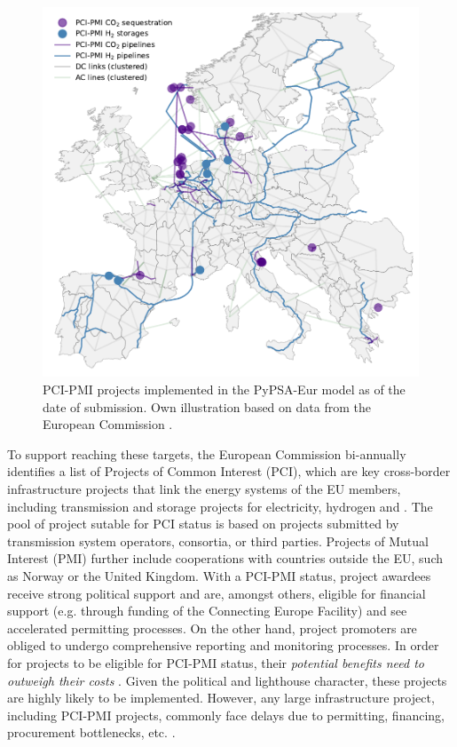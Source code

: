 \documentclass[final,5p,times,twocolumn]{elsarticle}
\let\autocite\cite
\begin{document}
\begin{figure}[t]
  \centering
  \includegraphics[width=1\linewidth]{pci_pmi_projects_map}
  \caption{PCI-PMI projects implemented in the PyPSA-Eur model as of the date of submission. Own illustration based on data from the European Commission \autocite{europeancommissionPCIPMITransparencyPlatform2024}.}
  \label{fig:pci_pmi_projects_map}
\end{figure}


To support reaching these targets, the European Commission bi-annually identifies a list of Projects of Common Interest (PCI), which are key cross-border infrastructure projects that link the energy systems of the EU members, including transmission and storage projects for electricity, hydrogen and  \autocite{europeancommissionCommissionDelegatedRegulation2023}. 
The pool of project sutable for PCI status is based on projects submitted by transmission system operators, consortia, or third parties. Projects of Mutual Interest (PMI) further include cooperations with countries outside the EU, such as Norway or the United Kingdom. With a PCI-PMI status, project awardees receive strong political support and are, amongst others, eligible for financial support (e.g. through funding of the Connecting Europe Facility) and see accelerated permitting processes. On the other hand, project promoters are obliged to undergo comprehensive reporting and monitoring processes. 
In order for projects to be eligible for PCI-PMI status, their \textit{potential benefits need to outweigh their costs} \autocite{europeancommissionCommissionDelegatedRegulation2023}. Given the political and lighthouse character, these projects are highly likely to be implemented. However, any large infrastructure project, including PCI-PMI projects, commonly face delays due to permitting, financing, procurement bottlenecks, etc. \autocite{acerConsolidatedReportProgress2023}.
\end{document}
